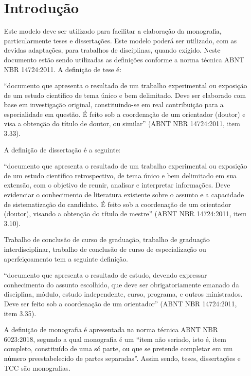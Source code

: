 \chapter{Introdução}

Este modelo deve ser utilizado para facilitar a elaboração da monografia, particularmente teses e dissertações. Este modelo poderá ser utilizado, com as devidas adaptações, para trabalhos de disciplinas, quando exigido.
Neste documento estão sendo utilizadas as definições conforme a norma técnica ABNT NBR 14724:2011. A definição de tese é:
\begin{citacao}
“documento que apresenta o resultado de um trabalho experimental ou exposição de um estudo científico de tema único e bem delimitado. Deve ser elaborado com base em investigação original, constituindo-se em real contribuição para a especialidade em questão. É feito sob a coordenação de um orientador (doutor) e visa a obtenção do título de doutor, ou similar” (ABNT NBR 14724:2011, item 3.33).
\end{citacao}
A definição de dissertação é a seguinte:
\begin{citacao}
“documento que apresenta o resultado de um trabalho experimental ou exposição de um estudo científico retrospectivo, de tema único e bem delimitado em sua extensão, com o objetivo de reunir, analisar e interpretar informações. Deve evidenciar o conhecimento de literatura existente sobre o assunto e a capacidade de sistematização do candidato. É feito sob a coordenação de um orientador (doutor), visando a obtenção do título de mestre” (ABNT NBR 14724:2011, item 3.10).
\end{citacao}
Trabalho de conclusão de curso de graduação, trabalho de graduação interdisciplinar, trabalho de conclusão de curso de especialização ou aperfeiçoamento tem a seguinte definição.
\begin{citacao}
“documento que apresenta o resultado de estudo, devendo expressar conhecimento do assunto escolhido, que deve ser obrigatoriamente emanado da disciplina, módulo, estudo independente, curso, programa, e outros ministrados. Deve ser feito sob a coordenação de um orientador” (ABNT NBR 14724:2011, item 3.35).
\end{citacao}

A definição de monografia é apresentada na norma técnica ABNT NBR 6023:2018, segundo a qual monografia é um “item não seriado, isto é, item completo, constituído de uma só parte, ou que se pretende completar em um número preestabelecido de partes separadas”. Assim sendo, teses, dissertações e TCC são monografias.

